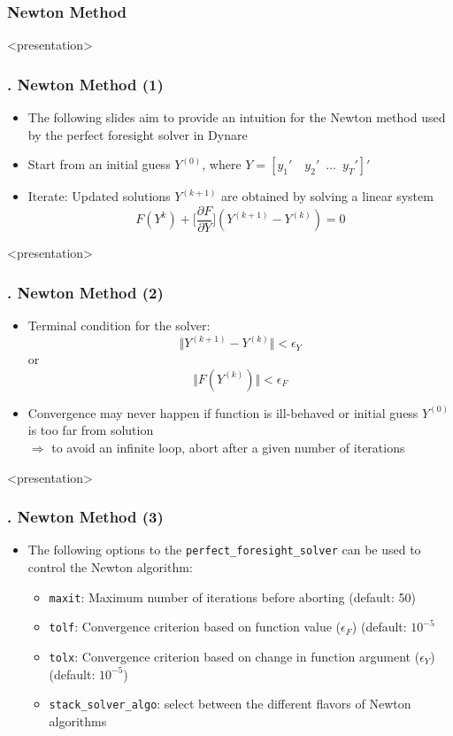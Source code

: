 \documentclass[11pt,aspectratio=169]{beamer}
\begin{document}
\subsubsection{Newton Method}
\begin{frame}<presentation>
	\frametitle{{\thesection.\thesubsection\thinspace\thesubsubsection} Newton Method (1)}
	\begin{itemize}
		\item The following slides aim to provide an intuition for the Newton method used by the perfect foresight solver in Dynare
		\item Start from an initial guess $Y^{(0)}$, where $Y=[y_1' \quad y_2' \enspace \ldots \enspace y_T']'$
		\item Iterate: Updated solutions $Y^{(k+1)}$ are obtained by solving a linear system 
		$$F(Y^{k}) + \bigg[\frac{\partial F}{\partial Y}\bigg] (Y^{(k+1)} - Y^{(k)}) = 0$$
	\end{itemize}
\end{frame}
\begin{frame}<presentation>
	\frametitle{{\thesection.\thesubsection\thinspace\thesubsubsection} Newton Method (2)}
	\begin{itemize}
		\item Terminal condition for the solver:
		$$\Vert Y^{(k+1)} - Y^{(k)} \Vert < \epsilon_Y$$
		or
		$$\Vert F(Y^{(k)}) \Vert < \epsilon_F$$
		\item Convergence may never happen if function is ill-behaved or initial guess $Y^{(0)}$ is too far from solution\\
		$\Rightarrow$ to avoid an infinite loop, abort after a given number of iterations
	\end{itemize}
\end{frame}
\begin{frame}<presentation>
	\frametitle{{\thesection.\thesubsection\thinspace\thesubsubsection} Newton Method (3)}
	\begin{itemize}
		\item The following options to the \texttt{perfect\_foresight\_solver} can be used to control the Newton algorithm:\\
		\begin{itemize}
			\item \texttt{maxit}: Maximum number of iterations before aborting (default: 50)
			\item \texttt{tolf}: Convergence criterion based on function value ($\epsilon_F$) (default: $10^{-5}$ 
			\item \texttt{tolx}: Convergence criterion based on change in function argument ($\epsilon_Y$) (default: $10^{-5}$)
			\item \texttt{stack\_solver\_algo}: select between the different flavors of Newton algorithms
		\end{itemize}
	\end{itemize}
\end{frame}
\end{document}
